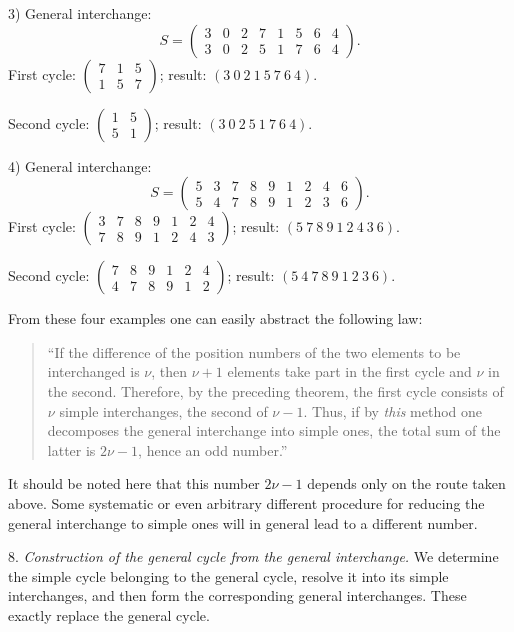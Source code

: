 \documentclass[10pt]{article}
\begin{document}
3) General interchange:
\[
S=\begin{pmatrix}3&0&2&7&1&5&6&4\\3&0&2&5&1&7&6&4\end{pmatrix}.
\]
First cycle: \(\begin{pmatrix}7&1&5\\1&5&7\end{pmatrix}\); result: \((3\ 0\ 2\ 1\ 5\ 7\ 6\ 4)\).

Second cycle: \(\begin{pmatrix}1&5\\5&1\end{pmatrix}\); result: \((3\ 0\ 2\ 5\ 1\ 7\ 6\ 4)\).

4) General interchange:
\[
S=\begin{pmatrix}5&3&7&8&9&1&2&4&6\\5&4&7&8&9&1&2&3&6\end{pmatrix}.
\]
First cycle: \(\begin{pmatrix}3&7&8&9&1&2&4\\7&8&9&1&2&4&3\end{pmatrix}\); result: \((5\ 7\ 8\ 9\ 1\ 2\ 4\ 3\ 6)\).

Second cycle: \(\begin{pmatrix}7&8&9&1&2&4\\4&7&8&9&1&2\end{pmatrix}\); result: \((5\ 4\ 7\ 8\ 9\ 1\ 2\ 3\ 6)\).

From these four examples one can easily abstract the following law:
\begin{quote}
``If the difference of the position numbers of the two elements to be interchanged is \(\nu\), then \(\nu+1\) elements take part in the first cycle and \(\nu\) in the second. Therefore, by the preceding theorem, the first cycle consists of \(\nu\) simple interchanges, the second of \(\nu-1\). Thus, if by \emph{this} method one decomposes the general interchange into simple ones, the total sum of the latter is \(2\nu-1\), hence an odd number.''
\end{quote}
It should be noted here that this number \(2\nu-1\) depends only on the route taken above. Some systematic or even arbitrary different procedure for reducing the general interchange to simple ones will in general lead to a different number.

8. \emph{Construction of the general cycle from the general interchange.} We determine the simple cycle belonging to the general cycle, resolve it into its simple interchanges, and then form the corresponding general interchanges. These exactly replace the general cycle.
\end{document}
